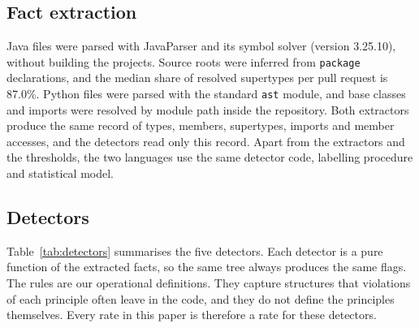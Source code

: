 \documentclass[sigconf]{acmart}
\begin{document}
\subsection{Fact extraction}

Java files were parsed with JavaParser and its symbol solver (version 3.25.10), without building the
projects. Source roots were inferred from \texttt{package} declarations, and the median share of
resolved supertypes per pull request is 87.0\%. Python files were parsed with the standard
\texttt{ast} module, and base classes and imports were resolved by module path inside the repository.
Both extractors produce the same record of types, members, supertypes, imports and member accesses,
and the detectors read only this record. Apart from the extractors and the thresholds, the two
languages use the same detector code, labelling procedure and statistical model.

\subsection{Detectors}
\label{sec:detectors}

Table~\ref{tab:detectors} summarises the five detectors. Each detector is a pure function of the
extracted facts, so the same tree always produces the same flags. The rules are our operational
definitions. They capture structures that violations of each principle often leave in the code, and
they do not define the principles themselves. Every rate in this paper is therefore a rate for these
detectors.
\end{document}
